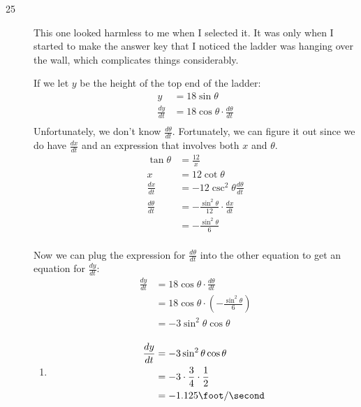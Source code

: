 \documentclass[fleqn]{exam}
\begin{document}
\begin{description}
\item[25]
This one looked harmless to me when I selected it.  It was only when I started to make the answer key that I noticed the
ladder was hanging over the wall, which complicates things considerably.

If we let $y$ be the height of the top end of the ladder:
\begin{align*}
  y &= 18 \sin \theta \\
  \frac{dy}{dt} &= 18 \cos \theta \cdot \frac{d \theta}{dt} \\
\end{align*}
Unfortunately, we don't know $\frac{d \theta}{dt}$.  Fortunately, we can figure it out since we do have $\frac{dx}{dt}$
and an expression that involves both $x$ and $\theta$.
\begin{align*}
  \tan \theta &= \frac{12}{x} \\
  x &= 12 \cot \theta \\
  \frac{dx}{dt} &= -12 \csc^2 \theta \frac{d \theta}{dt} \\
  \frac{d \theta}{dt} &= - \frac{\sin^2 \theta}{12} \cdot \frac{dx}{dt} \\
   &= - \frac{\sin^2 \theta}{6}  \\
\end{align*}

Now we can plug the expression for $\frac{d \theta}{dt}$ into the other equation to get an equation for $\frac{dy}{dt}$:
\begin{align*}
  \frac{dy}{dt} &= 18 \cos \theta \cdot \frac{d \theta}{dt} \\
   &= 18 \cos \theta \cdot \left( - \frac{\sin^2 \theta}{6} \right) \\
   &= -3 \sin^2 \theta \cos \theta \\
\end{align*}

\begin{enumerate}[a]

\item
\begin{align*}
  \frac{dy}{dt} &= - 3 \sin^2 \theta \cos \theta \\
  &= -3 \cdot \frac{3}{4} \cdot \frac{1}{2}  \\
  &= - 1.125 \foot / \second \\
\end{align*}


\end{enumerate}
\end{description}
\end{document}

